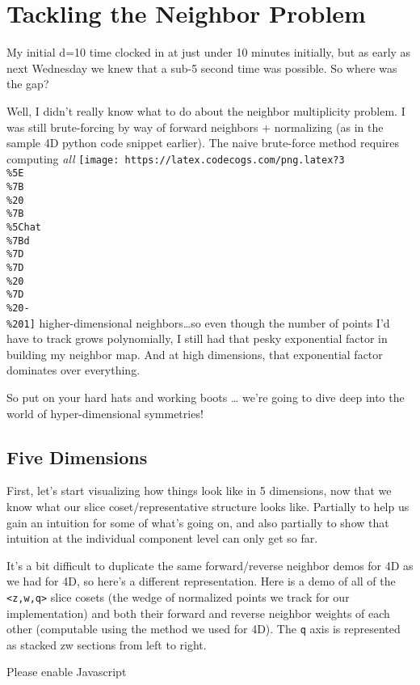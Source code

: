 \documentclass[]{article}
\begin{document}
\hypertarget{tackling-the-neighbor-problem}{%
\section{Tackling the Neighbor Problem}\label{tackling-the-neighbor-problem}}

My initial d=10 time clocked in at just under 10 minutes initially, but as early
as next Wednesday we knew that a sub-5 second time was possible. So where was
the gap?

Well, I didn't really know what to do about the neighbor multiplicity problem. I
was still brute-forcing by way of forward neighbors + normalizing (as in the
sample 4D python code snippet earlier). The naive brute-force method requires
computing \emph{all}
\texttt{[image: https://latex.codecogs.com/png.latex?3\\\%5E\\\%7B\\\%20\\\%7B\\\%5Chat\\\%7Bd\\\%7D\\\%7D\\\%20\\\%7D\\\%20-\\\%201]}
higher-dimensional neighbors\ldots so even though the number of points I'd have
to track grows polynomially, I still had that pesky exponential factor in
building my neighbor map. And at high dimensions, that exponential factor
dominates over everything.

So put on your hard hats and working boots \ldots{} we're going to dive deep
into the world of hyper-dimensional symmetries!

\hypertarget{five-dimensions}{%
\subsection{Five Dimensions}\label{five-dimensions}}

First, let's start visualizing how things look like in 5 dimensions, now that we
know what our slice coset/representative structure looks like. Partially to help
us gain an intuition for some of what's going on, and also partially to show
that intuition at the individual component level can only get so far.

It's a bit difficult to duplicate the same forward/reverse neighbor demos for 4D
as we had for 4D, so here's a different representation. Here is a demo of all of
the \texttt{\textless{}z,w,q\textgreater{}} slice cosets (the wedge of
normalized points we track for our implementation) and both their forward and
reverse neighbor weights of each other (computable using the method we used for
4D). The \texttt{q} axis is represented as stacked zw sections from left to
right.

\leavevmode\hypertarget{golSyms5D}{}%
Please enable Javascript
\end{document}
